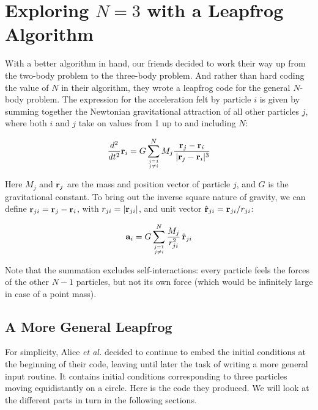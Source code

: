 \chapter{Exploring $N = 3$ with a Leapfrog Algorithm}

With a better algorithm in hand, our friends decided to work their way
up from the two-body problem to the three-body problem.  And rather
than hard coding the value of $N$ in their algorithm, they wrote a
leapfrog code for the general $N$-body problem.  The expression for
the acceleration felt by particle $i$ is given by summing together the
Newtonian gravitational attraction of all other particles $j$, where
both $i$ and $j$ take on values from 1 up to and including $N$:

\begin{equation}
\frac{d^2}{dt^2}{\bf r}_i =  G \sum_{j=1 \atop j \neq i}^N M_j
\frac{{\bf r}_j - {\bf r}_i}{\,|{\bf r}_j - {\bf r}_i|^3}
\end{equation}

\noindent
Here $M_j$  and ${\bf r}_j$ are the mass and position vector of particle $j$,
and $G$ is the gravitational constant.  To bring out the inverse square
nature of gravity, we can define ${\bf r}_{ji} = {\bf r}_j - {\bf r}_i$, with
$r_{ji} = |{\bf r}_{ji}|$, and unit vector $\hat {{\bf r}}_{ji} = {\bf r}_{ji} / r_{ji}$:

\begin{equation}
\ba_i = G \sum_{j=1 \atop j \neq i}^N
\frac{M_j}{r_{ji}^2} \,\hat\br_{ji}\label{newton}
\end{equation}

\noindent
Note that the summation excludes self-interactions: every particle
feels the forces of the other $N-1$ particles, but not its own force
(which would be infinitely large in case of a point mass).

\section{A More General Leapfrog}

For simplicity, Alice {\it et al.} decided to continue to embed the
initial conditions at the beginning of their code, leaving until later
the task of writing a more general input routine.  It contains initial
conditions corresponding to three particles moving equidistantly on a
circle.  Here is the code they produced.  We will look at the
different parts in turn in the following sections.


